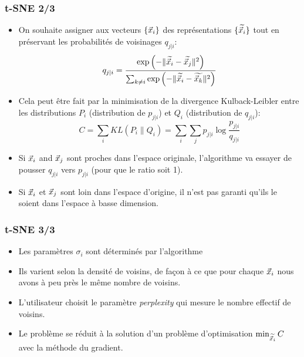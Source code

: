 \begin{frame}
\frametitle{t-SNE 2/3}
\begin{itemize}
	\item On souhaite assigner aux vecteurs $\{\vec{x}_i\}$ des représentations $\{\widetilde{\vec{x}_i}\}$ tout en préservant les probabilités de voisinages $q_{j|i}$: 
	\begin{equation*}
	q_{j|i} = \frac{\exp{\left(-\|\widetilde{\vec{x}_i} - \widetilde{\vec{x}_j}\|^2\right)}}{\sum_{k\neq i} \exp{\left(-\|\widetilde{\vec{x}_i} - \widetilde{\vec{x}_k}\|^2\right)} }
	\end{equation*}
	\item Cela peut être fait par la minimisation de la divergence Kulback-Leibler entre les distributions $P_i$ (distribution de $p_{j|i}$) et $Q_i$ (distribution de $q_{j|i}$): 
	\begin{equation}
		C = \sum_i KL(P_i\|Q_i) = \sum_i \sum_j p_{j|i}\log{\frac{p_{j|i}}{q_{j|i}}}
	\end{equation}
	\item Si $\vec{x}_i$ and $\vec{x}_j$ sont proches dans l'espace originale, l'algorithme va essayer de pousser $q_{j|i}$ vers $p_{j|i}$ (pour que le ratio soit 1). 
	\item Si $\vec{x}_i$ et $\vec{x}_j$ sont loin dans l'espace d'origine, il n'est pas garanti qu'ils le soient dans l'espace à basse dimension. 
\end{itemize}
\end{frame}

\begin{frame}
\frametitle{t-SNE 3/3}
\begin{itemize}
	\item Les paramètres $\sigma_i$ sont déterminés par l'algorithme
	\item Ils varient selon la densité de voisins, de façon à ce que pour chaque $\vec{x}_i$ nous avons à peu près le même nombre de voisins. 
	\item L'utilisateur choisit le paramètre \textit{perplexity} qui mesure le nombre effectif de voisins. 
	\item Le problème se réduit à la solution d'un problème d'optimisation $\min_{\widetilde{\vec{x}_i}} C$ avec la méthode du gradient.
\end{itemize}
\end{frame}

